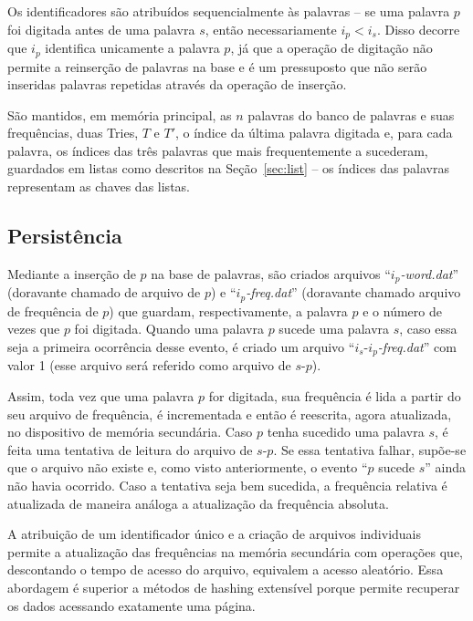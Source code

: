 \documentclass[12pt]{article}
\begin{document}
    Os identificadores são atribuídos sequencialmente às palavras -- se uma palavra $p$ foi digitada antes de uma palavra $s$, então necessariamente $i_p < i_s$.
    Disso decorre que $i_p$ identifica unicamente a palavra $p$, já que a operação de digitação não permite a reinserção de palavras na base e é um pressuposto que não serão inseridas palavras repetidas através da operação de inserção.

    São mantidos, em memória principal, as $n$ palavras do banco de palavras e suas frequências, duas Tries, $T$ e $T'$, o índice da última palavra digitada e, para cada palavra, os índices das três palavras que mais frequentemente a sucederam, guardados em listas como descritos na Seção~\ref{sec:list} -- os índices das palavras representam as chaves das listas.

    \subsection{Persistência}
    Mediante a inserção de $p$ na base de palavras, são criados arquivos ``$i_p$\emph{-word.dat}'' (doravante chamado de arquivo de $p$) e ``$i_p$\emph{-freq.dat}'' (doravante chamado arquivo de frequência de $p$) que guardam, respectivamente, a palavra $p$ e o número de vezes que $p$ foi digitada.
    Quando uma palavra $p$ sucede uma palavra $s$, caso essa seja a primeira ocorrência desse evento, é criado um arquivo ``$i_s$-$i_p$\emph{-freq.dat}'' com valor 1 (esse arquivo será referido como arquivo de $s$-$p$).

    Assim, toda vez que uma palavra $p$ for digitada, sua frequência é lida a partir do seu arquivo de frequência, é incrementada e então é reescrita, agora atualizada, no dispositivo de memória secundária.
    Caso $p$ tenha sucedido uma palavra $s$, é feita uma tentativa de leitura do arquivo de $s$-$p$.
    Se essa tentativa falhar, supõe-se que o arquivo não existe e, como visto anteriormente, o evento ``$p$ sucede $s$'' ainda não havia ocorrido.
    Caso a tentativa seja bem sucedida, a frequência relativa é atualizada de maneira análoga a atualização da frequência absoluta.

    A atribuição de um identificador único e a criação de arquivos individuais permite a atualização das frequências na memória secundária com operações que, descontando o tempo de acesso do arquivo, equivalem a acesso aleatório.
    Essa abordagem é superior a métodos de hashing extensível porque permite recuperar os dados acessando exatamente uma página.
\end{document}
